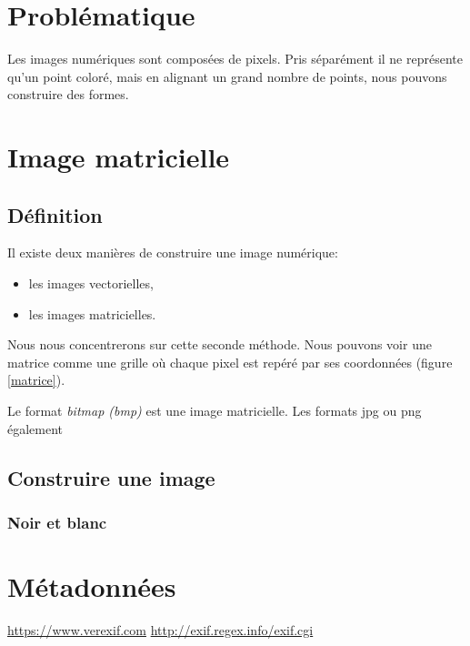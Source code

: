 \documentclass[a4paper,11pt]{article}
\begin{document}
\begin{Form}
\section{Problématique}
Les images numériques sont composées de pixels. Pris séparément il ne représente qu'un point coloré, mais en alignant un grand nombre de points, nous pouvons construire des formes. 
\begin{center}
\end{center}
\section{Image matricielle}
\subsection{Définition}
Il existe deux manières de construire une image numérique:
\begin{itemize}
\item les images vectorielles,
\item les images matricielles.
\end{itemize}
Nous nous concentrerons sur cette seconde méthode. Nous pouvons voir une matrice comme une grille où chaque pixel est repéré par ses coordonnées (figure \ref{matrice}).
\begin{center}
\label{matrice}
\end{center}
Le format \emph{bitmap (bmp)} est une image matricielle. Les formats jpg ou png également
\subsection{Construire une image}
\subsubsection{Noir et blanc}
\section{Métadonnées}
\url{https://www.verexif.com}
\url{http://exif.regex.info/exif.cgi}

\end{Form}
\end{document}
